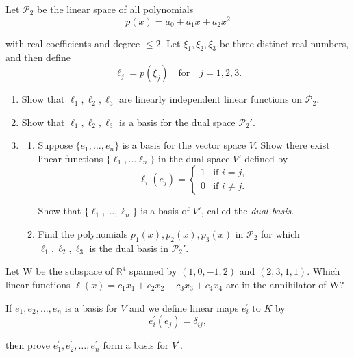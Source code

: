   \begin{exercise}[Lax 2.6] 
    Let $\mathcal{P}_2$ be the linear space of all polynomials
    \[p(x) = a_0 + a_1x + a_2x^2\]
    
    with real coefficients and degree $\leq 2$. Let $\xi_1, \xi_2, \xi_3$ be three distinct real numbers, and then define
    \[\ell_j = p(\xi_j) \quad \text{for} \quad j = 1,2,3.\]
    
    \begin{enumerate}
      \item[(a)] Show that $\ell_1, \ell_2, \ell_3$ are linearly independent linear functions on $\mathcal{P}_2$.
      \item[(b)] Show that $\ell_1, \ell_2, \ell_3$ is a basis for the dual space $\mathcal{P}_2'$.
      \item[(c)] 
        \begin{enumerate}
          \item[(1)] Suppose $\{e_1, \ldots, e_n\}$ is a basis for the vector space $V$. Show there exist linear functions $\{\ell_1, \ldots \ell_n\}$ in the dual space $V'$ defined by
          \[\ell_i(e_j) = \begin{cases} 1 & \text{if } i = j, \\ 0 & \text{if } i \neq j. \end{cases}\]
        
          Show that $\{\ell_1, \ldots, \ell_n\}$ is a basis of $V'$, called the \textit{dual basis}.
          \item[(2)] Find the polynomials $p_1(x), p_2(x), p_3(x)$ in $\mathcal{P}_2$ for which $\ell_1, \ell_2, \ell_3$ is the dual basis in $\mathcal{P}_2'$.
        \end{enumerate}
    \end{enumerate}
  \end{exercise}

  \begin{exercise}[Lax 2.7] 
    Let W be the subspace of $\mathbb{R}^4$ spanned by $(1, 0, -1, 2)$ and $(2, 3, 1, 1)$.
    Which linear functions $\ell(x) = c_1x_1 + c_2x_2 + c_3x_3 + c_4x_4$ are in the annihilator of W?
  \end{exercise}

  \begin{exercise} 
    If $e_1, e_2, \ldots, e_n$ is a basis for $V$ and we define linear maps $e_i^\prime$ to $K$ by
    \[e_i^\prime(e_j) = \delta_{ij},\]
    
    then prove $e_1^\prime, e_2^\prime, \ldots, e_n^\prime$ form a basis for $V^\prime$.
  \end{exercise}

